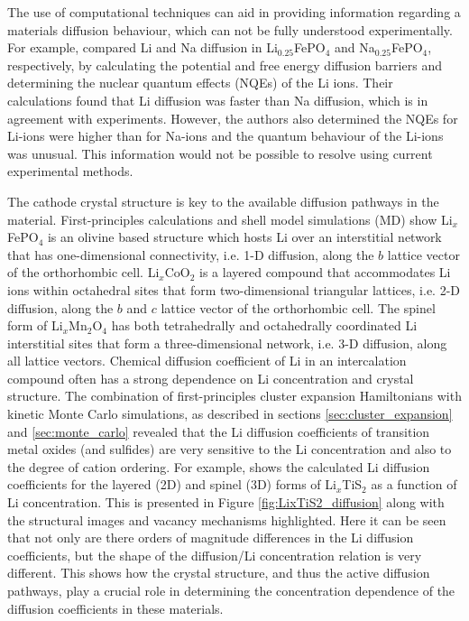 \documentclass[../main.tex]{subfiles}
\begin{document}
The use of computational techniques can aid in providing information regarding a materials diffusion behaviour, which can not be fully understood experimentally. For example, \citeauthor{dixit2015classical} compared Li and Na diffusion in Li$_{0.25}$FePO$_4$ and Na$_{0.25}$FePO$_4$, respectively, by calculating the potential and free energy diffusion barriers and determining the nuclear quantum effects (NQEs) of the Li ions. \cite{dixit2015classical} Their calculations found that Li diffusion was faster than Na diffusion, which is in agreement with experiments. However, the authors also determined the NQEs for Li-ions were higher than for Na-ions and the quantum behaviour of the Li-ions was unusual. This information would not be possible to resolve using current experimental methods.

The cathode crystal structure is key to the available diffusion pathways in the material. First-principles calculations \cite{Morgan2004,ouyang2004first} and shell model simulations (MD)\cite{islam2005atomic} show Li$_x$FePO$_4$ is an olivine based structure which hosts Li over an interstitial network that has one-dimensional connectivity, i.e. 1-D diffusion, along the $b$ lattice vector of the orthorhombic cell.\cite{amin2006anisotropy} Li$_x$CoO$_2$ is a layered compound that accommodates Li ions within octahedral sites that form two-dimensional triangular lattices, i.e. 2-D diffusion, along the $b$ and $c$ lattice vector of the orthorhombic cell. \cite{van2000lithium} The spinel form of Li$_x$Mn$_2$O$_4$ has both tetrahedrally and octahedrally coordinated Li interstitial sites that form a three-dimensional network, i.e. 3-D diffusion, along all lattice vectors. \cite{thackeray1997manganese,proell20123d} Chemical diffusion coefficient of Li in an intercalation compound often has a strong dependence on Li concentration and crystal structure. The combination of first-principles cluster
expansion Hamiltonians with kinetic Monte Carlo simulations, as described in sections \ref{sec:cluster_expansion} and \ref{sec:monte_carlo} revealed that the Li diffusion coefficients of transition metal oxides (and sulfides) are very sensitive to the Li concentration and also to the degree of cation ordering. \cite{van2008nondilute,VanderVen2001, bhattacharya2011first,bhattacharya2010phase,VanDerVen2013} For example, \citeauthor{VanderVen2020} shows the calculated Li diffusion coefficients for the layered (2D) and spinel (3D) forms of Li$_x$TiS$_2$ as a function of Li concentration. \cite{VanderVen2020,VanDerVen2013,van2008nondilute,bhattacharya2011first} This is presented in Figure \ref{fig:LixTiS2_diffusion} along with the structural images and vacancy mechanisms highlighted. Here it can be seen that not only are there orders of magnitude differences in the Li diffusion coefficients, but the shape of the diffusion/Li concentration relation is very different. This shows how the crystal structure, and thus the active diffusion pathways, play a crucial role in determining the concentration dependence of the diffusion coefficients in these materials.
\end{document}
